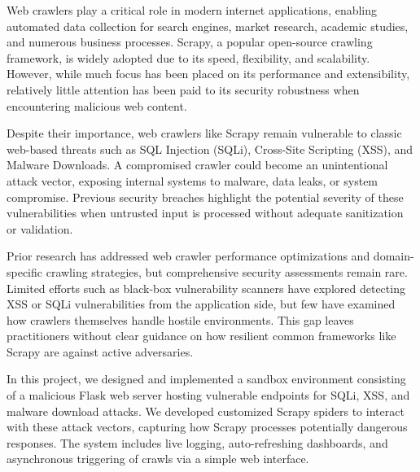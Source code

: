 

Web crawlers play a critical role in modern internet applications, enabling automated data collection for search engines, market research, academic studies, and numerous business processes. Scrapy, a popular open-source crawling framework, is widely adopted due to its speed, flexibility, and scalability. However, while much focus has been placed on its performance and extensibility, relatively little attention has been paid to its security robustness when encountering malicious web content.

Despite their importance, web crawlers like Scrapy remain vulnerable to classic web-based threats such as SQL Injection (SQLi), Cross-Site Scripting (XSS), and Malware Downloads. A compromised crawler could become an unintentional attack vector, exposing internal systems to malware, data leaks, or system compromise. Previous security breaches highlight the potential severity of these vulnerabilities when untrusted input is processed without adequate sanitization or validation.

Prior research has addressed web crawler performance optimizations and domain-specific crawling strategies, but comprehensive security assessments remain rare. Limited efforts such as black-box vulnerability scanners have explored detecting XSS or SQLi vulnerabilities from the application side, but few have examined how crawlers themselves handle hostile environments. This gap leaves practitioners without clear guidance on how resilient common frameworks like Scrapy are against active adversaries.

In this project, we designed and implemented a sandbox environment consisting of a malicious Flask web server hosting vulnerable endpoints for SQLi, XSS, and malware download attacks. We developed customized Scrapy spiders to interact with these attack vectors, capturing how Scrapy processes potentially dangerous responses. The system includes live logging, auto-refreshing dashboards, and asynchronous triggering of crawls via a simple web interface.

